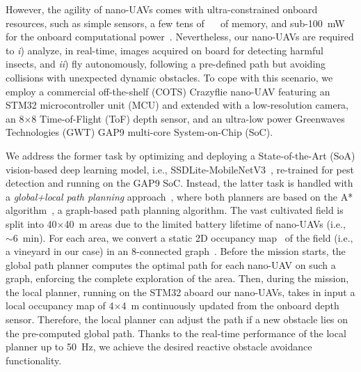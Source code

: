 However, the agility of nano-UAVs comes with ultra-constrained onboard resources, such as simple sensors, a few tens of \SI{}{\mega\byte} of memory, and sub-\SI{100}{\milli\watt} for the onboard computational power~\cite{palossi2019open}.
Nevertheless, our nano-UAVs are required to \textit{i}) analyze, in real-time, images acquired on board for detecting harmful insects, and \textit{ii}) fly autonomously, following a pre-defined path but avoiding collisions with unexpected dynamic obstacles.
To cope with this scenario, we employ a commercial off-the-shelf (COTS) Crazyflie nano-UAV featuring an STM32 microcontroller unit (MCU) and extended with a low-resolution camera, an 8$\times$8 Time-of-Flight (ToF) depth sensor, and an ultra-low power Greenwaves Technologies (GWT) GAP9 multi-core System-on-Chip (SoC).

We address the former task by optimizing and deploying a State-of-the-Art (SoA) vision-based deep learning model, i.e., SSDLite-MobileNetV3~\citep{howard2019searching}, re-trained for pest detection and running on the GAP9 SoC.
Instead, the latter task is handled with a \textit{global+local path planning} approach~\cite{marin2018global}, where both planners are based on the A* algorithm~\cite{hart1968formal}, a graph-based path planning algorithm.
The vast cultivated field is split into 40$\times$\SI{40}{\meter} areas due to the limited battery lifetime of nano-UAVs (i.e., $\sim$\SI{6}{\minute}).
For each area, we convert a static 2D occupancy map~\cite{30720} of the field (i.e., a vineyard in our case) in an 8-connected graph~\cite{HALIN1969150}.
Before the mission starts, the global path planner computes the optimal path for each nano-UAV on such a graph, enforcing the complete exploration of the area.
Then, during the mission, the local planner, running on the STM32 aboard our nano-UAVs, takes in input a local occupancy map of 4$\times$\SI{4}{\meter} continuously updated from the onboard depth sensor.
Therefore, the local planner can adjust the path if a new obstacle lies on the pre-computed global path.
Thanks to the real-time performance of the local planner up to \SI{50}{\hertz}, we achieve the desired reactive obstacle avoidance functionality.

